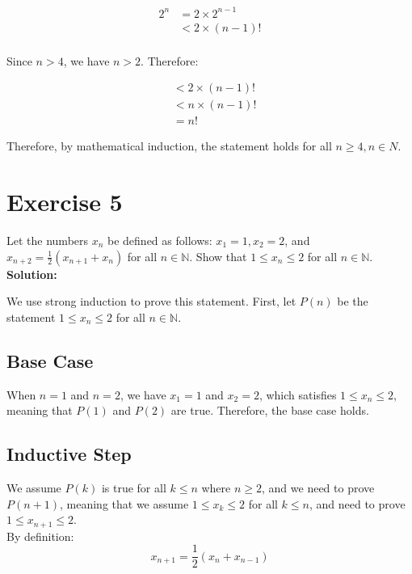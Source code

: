 \documentclass{article}
\begin{document}
\begin{align*}
    2^n & = 2 \times 2^{n-1} \\
    & < 2 \times (n-1)! \\
\end{align*}

Since $n > 4$, we have $n > 2$. Therefore:

\begin{align*}
    & < 2 \times (n-1)! \\
    & < n \times (n-1)! \\
    & = n!
\end{align*}

Therefore, by mathematical induction, the statement holds for all $n \geq 4, n \in N$.

\newpage

\section*{Exercise 5}

Let the numbers $x_n$ be defined as follows: $x_1 = 1, x_2 = 2$, and $x_{n+2} = \frac{1}{2}(x_{n+1} + x_n)$ for all $n \in \mathbb{N}$. Show that $1 \leq x_n \leq 2$ for all $n \in \mathbb{N}$.\\

\textbf{Solution:}

We use strong induction to prove this statement. First, let $P(n)$ be the statement $1 \leq x_n \leq 2$ for all $n \in \mathbb{N}$.

\subsection*{Base Case}

When $n = 1$ and $n = 2$, we have $x_1 = 1$ and $x_2 = 2$, which satisfies $1 \leq x_n \leq 2$, meaning that $P(1)$ and $P(2)$ are true. Therefore, the base case holds.

\subsection*{Inductive Step}

We assume $P(k)$ is true for all $k \leq n$ where $n \geq 2$, and we need to prove $P(n+1)$, meaning that we assume $1 \leq x_k \leq 2$ for all $k \leq n$, and need to prove $1 \leq x_{n+1} \leq 2$. \\

By definition:
$$x_{n+1} = \frac{1}{2}(x_n + x_{n-1})$$
\end{document}
